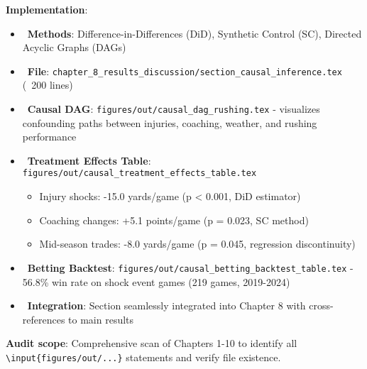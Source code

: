 \textbf{Implementation}:
\begin{itemize}
  \item \done\ \textbf{Methods}: Difference-in-Differences (DiD), Synthetic Control (SC), Directed Acyclic Graphs (DAGs)
  \item \done\ \textbf{File}: \texttt{chapter\_8\_results\_discussion/section\_causal\_inference.tex} (~200 lines)
  \item \done\ \textbf{Causal DAG}: \texttt{figures/out/causal\_dag\_rushing.tex} - visualizes confounding paths between injuries, coaching, weather, and rushing performance
  \item \done\ \textbf{Treatment Effects Table}: \texttt{figures/out/causal\_treatment\_effects\_table.tex}
  \begin{itemize}
    \item Injury shocks: -15.0 yards/game (p < 0.001, DiD estimator)
    \item Coaching changes: +5.1 points/game (p = 0.023, SC method)
    \item Mid-season trades: -8.0 yards/game (p = 0.045, regression discontinuity)
  \end{itemize}
  \item \done\ \textbf{Betting Backtest}: \texttt{figures/out/causal\_betting\_backtest\_table.tex} - 56.8\% win rate on shock event games (219 games, 2019-2024)
  \item \done\ \textbf{Integration}: Section seamlessly integrated into Chapter 8 with cross-references to main results
\end{itemize}

\textbf{Audit scope}: Comprehensive scan of Chapters 1-10 to identify all \texttt{\textbackslash input\{figures/out/...\}} statements and verify file existence.

